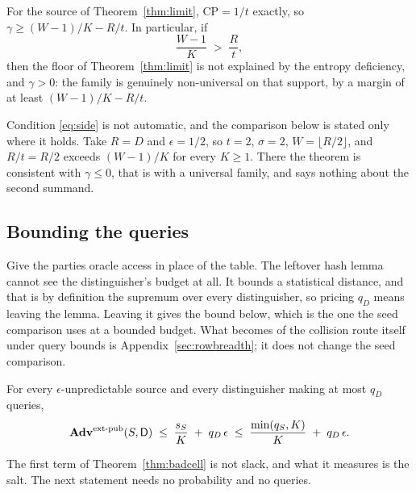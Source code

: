 \documentclass{aicr-solution}
\newcommand{\Adv}{\mathbf{Adv}}
\newcommand{\extpub}{\textup{ext-pub}}
\newcommand{\CP}{\mathrm{CP}}
\begin{document}
\begin{lemma}[Attribution]\label{lem:attrib}
For the source of Theorem~\ref{thm:limit}, $\CP = 1/t$ exactly, so
$\gamma \ge (W-1)/K - R/t$. In particular, if
\begin{equation}\label{eq:side}
  \frac{W-1}{K} \;>\; \frac{R}{t} ,
\end{equation}
then the floor of Theorem~\ref{thm:limit} is not explained by the entropy deficiency, and
$\gamma > 0$: the family is genuinely non-universal on that support, by a margin of at least
$(W-1)/K - R/t$.
\end{lemma}

Condition \eqref{eq:side} is not automatic, and the comparison below is stated only where it holds.
Take $R = D$ and $\epsilon = 1/2$, so $t = 2$, $\sigma = 2$, $W = \lfloor R/2\rfloor$, and $R/t = R/2$
exceeds $(W-1)/K$ for every $K \ge 1$. There the theorem is consistent with $\gamma \le 0$, that is
with a universal family, and says nothing about the second summand.


\subsection*{Bounding the queries}

Give the parties oracle access in place of the table. The leftover hash lemma cannot see the
distinguisher's budget at all. It bounds a statistical distance, and that is by definition the
supremum over every distinguisher, so pricing $q_D$ means leaving the lemma. Leaving it gives the
bound below, which is the one the seed comparison uses at a bounded budget. What becomes of the
collision route itself under query bounds is Appendix~\ref{sec:rowbreadth}; it does not change the
seed comparison.

\begin{theorem}\label{thm:badcell}
For every $\epsilon$-unpredictable source and every distinguisher making at most $q_D$ queries,
\[
  \Adv^{\extpub}(S,\mathsf{D}) \;\le\; \frac{s_S}{K} \;+\; q_D\,\epsilon
  \;\le\; \frac{\min(q_S,K)}{K} \;+\; q_D\,\epsilon .
\]
\end{theorem}

The first term of Theorem~\ref{thm:badcell} is not slack, and what it measures is the salt. The
next statement needs no probability and no queries.
\end{document}
